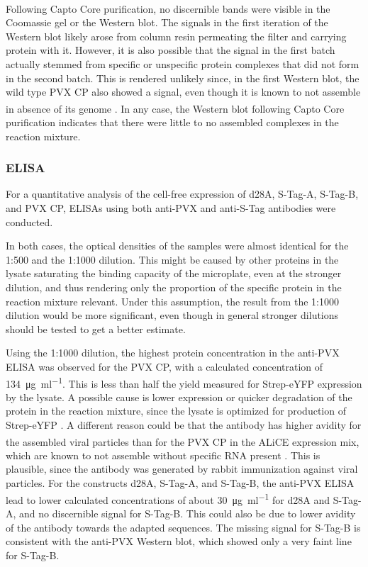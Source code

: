 Following Capto\textsuperscript{\texttrademark} Core purification, no discernible bands were visible in the Coomassie gel or the Western blot. The signals in the first iteration of the Western blot likely arose from column resin permeating the filter and carrying protein with it. However, it is also possible that the signal in the first batch actually stemmed from specific or unspecific protein complexes that did not form in the second batch. This is rendered unlikely since, in the first Western blot, the wild type PVX CP also showed a signal, even though it is known to not assemble in absence of its genome \cite{juli_sagt_keine_assembly}. In any case, the Western blot following Capto\textsuperscript{\texttrademark} Core purification indicates that there were little to no assembled complexes in the reaction mixture. 

\subsubsection{ELISA}
For a quantitative analysis of the cell-free expression of d28A, S-Tag-A, S-Tag-B, and PVX CP, ELISAs using both anti-PVX and anti-S-Tag antibodies were conducted. 

In both cases, the optical densities of the samples were almost identical for the 1:500 and the 1:1000 dilution. This might be caused by other proteins in the lysate saturating the binding capacity of the microplate, even at the stronger dilution, and thus rendering only the proportion of the specific protein in the reaction mixture relevant. Under this assumption, the result from the 1:1000 dilution would be more significant, even though in general stronger dilutions should be tested to get a better estimate. 

Using the 1:1000 dilution, the highest protein concentration in the anti-PVX ELISA was observed for the PVX CP, with a calculated concentration of \SI{134}{\micro\gram\per\milli\litre}. This is less than half the yield measured for Strep-eYFP expression by the lysate. A possible cause is lower expression or quicker degradation of the protein in the reaction mixture, since the lysate is optimized for production of Strep-eYFP \cite{alice_system}. A different reason could be that the antibody has higher avidity for the assembled viral particles than for the PVX CP in the ALiCE\textsuperscript{\textregistered} expression mix, which are known to not assemble without specific RNA present \cite{pvx_assembly}. This is plausible, since the antibody was generated by rabbit immunization against viral particles. For the constructs d28A, S-Tag-A, and S-Tag-B, the anti-PVX ELISA lead to lower calculated concentrations of about \SI{30}{\micro\gram\per\milli\litre} for d28A and S-Tag-A, and no discernible signal for S-Tag-B. This could also be due to lower avidity of the antibody towards the adapted sequences. The missing signal for S-Tag-B is consistent with the anti-PVX Western blot, which showed only a very faint line for S-Tag-B. 

